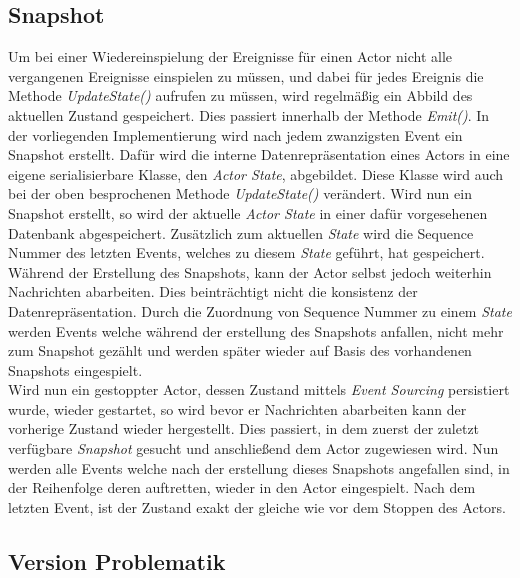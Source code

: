 \subsection{Snapshot}
\label{subsec:implementation:eventSouring:Snapshot}
Um bei einer Wiedereinspielung der Ereignisse für einen Actor nicht alle vergangenen Ereignisse einspielen zu müssen, und dabei für jedes Ereignis die Methode \textit{UpdateState()} aufrufen zu müssen, wird regelmäßig ein Abbild des aktuellen Zustand gespeichert. Dies passiert innerhalb der Methode \textit{Emit()}. In der vorliegenden Implementierung wird nach jedem zwanzigsten Event ein Snapshot erstellt. Dafür wird die interne Datenrepräsentation eines Actors in eine eigene serialisierbare Klasse, den \textit{Actor State}, abgebildet. Diese Klasse wird auch bei der oben besprochenen Methode \textit{UpdateState()} verändert. Wird nun ein Snapshot erstellt, so wird der aktuelle \textit{Actor State} in einer dafür vorgesehenen Datenbank abgespeichert. Zusätzlich zum aktuellen \textit{State} wird die Sequence Nummer des letzten Events, welches zu diesem \textit{State} geführt, hat gespeichert. Während der Erstellung des Snapshots, kann der Actor selbst jedoch weiterhin Nachrichten abarbeiten. Dies beinträchtigt nicht die konsistenz der Datenrepräsentation. Durch die Zuordnung von Sequence Nummer zu einem \textit{State} werden Events welche während der erstellung des Snapshots anfallen, nicht mehr zum Snapshot gezählt und werden später wieder auf Basis des vorhandenen Snapshots eingespielt. \\
Wird nun ein gestoppter Actor, dessen Zustand mittels \textit{Event Sourcing} persistiert wurde, wieder gestartet, so wird bevor er Nachrichten abarbeiten kann der  vorherige Zustand wieder hergestellt. Dies passiert, in dem zuerst der zuletzt verfügbare \textit{Snapshot} gesucht und anschließend dem Actor zugewiesen wird. Nun werden alle Events welche nach der erstellung dieses Snapshots angefallen sind, in der Reihenfolge deren auftretten, wieder in den Actor eingespielt. Nach dem letzten Event, ist der Zustand exakt der gleiche wie vor dem Stoppen des Actors.

\subsection{Version Problematik}